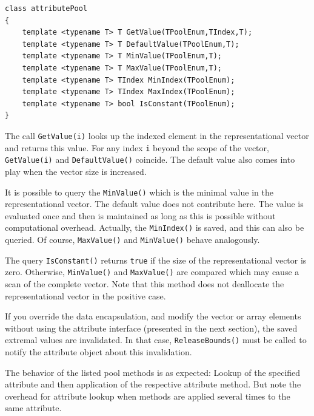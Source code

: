 \documentclass[a4paper,11pt,twoside]{book}
\begin{document}
\begin{multicols}{2}
\begin{mymethods}
\begin{verbatim}
class attributePool
{
    template <typename T> T GetValue(TPoolEnum,TIndex,T);
    template <typename T> T DefaultValue(TPoolEnum,T);
    template <typename T> T MinValue(TPoolEnum,T);
    template <typename T> T MaxValue(TPoolEnum,T);
    template <typename T> TIndex MinIndex(TPoolEnum);
    template <typename T> TIndex MaxIndex(TPoolEnum);
    template <typename T> bool IsConstant(TPoolEnum);
}
\end{verbatim}
\end{mymethods}
The call \verb/GetValue(i)/ looks up the indexed element in the representational
vector and returns this value. For any index \verb/i/ beyond the scope of the
vector, \verb/GetValue(i)/ and \verb/DefaultValue()/ coincide. The default value
also comes into play when the vector size is increased.

It is possible to query the \verb/MinValue()/ which is the minimal value in the
representational vector. The default value does not contribute here. The value
is evaluated once and then is maintained as long as this is possible without
computational overhead. Actually, the \verb/MinIndex()/ is saved, and this can
also be queried. Of course, \verb/MaxValue()/ and \verb/MinValue()/ behave analogously.

The query \verb/IsConstant()/ returns \verb/true/ if the size of the
representational vector is zero. Otherwise, \verb/MinValue()/ and \verb/MaxValue()/
are compared which may cause a scan of the complete vector. Note that this method
does not deallocate the representational vector in the positive case.

If you override the data encapsulation, and modify the vector or array elements
without using the attribute interface (presented in the next section), the saved
extremal values are invalidated. In that case, \verb/ReleaseBounds()/ must be
called to notify the attribute object about this invalidation.

The behavior of the listed pool methods is as expected: Lookup of the specified
attribute and then application of the respective attribute method. But note the
overhead for attribute lookup when methods are applied several times to the same
attribute.



\end{multicols}
\end{document}
